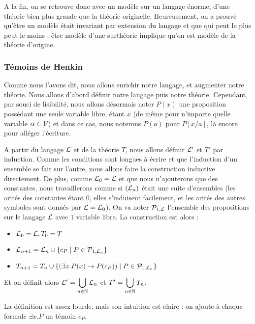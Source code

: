 A la fin, on se retrouve donc avec un modèle sur un langage énorme, d'une théorie bien plus grande que la théorie originelle. Heureusement, on a prouvé qu'être un modèle était invariant par extension du langage et que \og qui peut le plus peut le moins \fg{} : être modèle d'une surthéorie implique qu'on est modèle de la théorie d'origine.

\subsubsection{Témoins de Henkin}

Comme nous l'avons dit, nous allons enrichir notre langage, et augmenter notre théorie. Nous allons d'abord définir notre langage puis notre théorie. Cependant, par souci de lisibilité, nous allons désormais noter $P(x)$ une proposition possédant une seule variable libre, étant $x$ (de même pour n'importe quelle variable $\alpha\in\mathcal V$) et dans ce cas, nous noterons $P(a)$ pour $P[x/a]$, là encore pour alléger l'écriture.

\begin{defi}
    A partir du langage $\mathcal L$ et de la théorie $T$, nous allons définir $\mathcal L'$ et $T'$ par induction. Comme les conditions sont longues à écrire et que l'induction d'un ensemble se fait sur l'autre, nous allons faire la construction inductive directement. De plus, comme $\mathcal L_0=\mathcal L$ et que nous n'ajouterons que des constantes, nous travaillerons comme si $(\mathcal L_n)$ était une suite d'ensembles (les arités des constantes étant $0$, elles s'induisent facilement, et les arités des autres symboles sont donnés par $\mathcal L=\mathcal L_0$). On va noter $\mathcal P_{1,\mathcal L}$ l'ensemble des propositions sur le langage $\mathcal L$ avec $1$ variable libre. La construction est alors :
    \begin{itemize}[label=$\bullet$]
        \item $\mathcal L_0 = \mathcal L, T_0 = T$
        \item $\mathcal L_{n+1} = \mathcal L_n \cup \{ c_P \mid P \in \mathcal P_{1,\mathcal L_n}\}$
        \item $T_{n+1} = T_n \cup \{ (\exists x. P(x) \to P(c_P)) \mid P\in\mathcal P_{1,\mathcal L_n} \}$
    \end{itemize}
    Et on définit alors $\mathcal L' = \displaystyle{\bigcup_{n\in\mathbb{N}} \mathcal L_n}$ et $T' = \displaystyle{\bigcup_{n\in\mathbb{N}}T_n}$.
\end{defi}

La définition est assez lourde, mais son intuition est claire : on ajoute à chaque formule $\exists x.P$ un témoin $c_P$.

